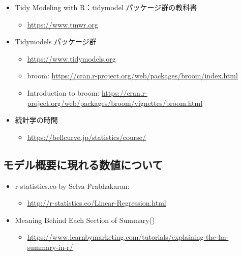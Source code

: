 \documentclass[
  xelatex, ja=standard]{bxjsbook}
\providecommand{\tightlist}{%
  \setlength{\itemsep}{0pt}\setlength{\parskip}{0pt}}
\theoremstyle{definition}
\theoremstyle{definition}
\theoremstyle{definition}
\theoremstyle{definition}
\theoremstyle{remark}
\begin{document}
\begin{itemize}
\tightlist
\item
  Tidy Modeling with R：tidymodel パッケージ群の教科書

  \begin{itemize}
  \tightlist
  \item
    \url{https://www.tmwr.org}
  \end{itemize}
\item
  Tidymodels パッケージ群

  \begin{itemize}
  \tightlist
  \item
    \url{https://www.tidymodels.org}
  \item
    broom: \url{https://cran.r-project.org/web/packages/broom/index.html}
  \item
    Introduction to broom: \url{https://cran.r-project.org/web/packages/broom/vignettes/broom.html}
  \end{itemize}
\item
  統計学の時間

  \begin{itemize}
  \tightlist
  \item
    \url{https://bellcurve.jp/statistics/course/}
  \end{itemize}
\end{itemize}

\hypertarget{ux30e2ux30c7ux30ebux6982ux8981ux306bux73feux308cux308bux6570ux5024ux306bux3064ux3044ux3066}{%
\subsection{モデル概要に現れる数値について}\label{ux30e2ux30c7ux30ebux6982ux8981ux306bux73feux308cux308bux6570ux5024ux306bux3064ux3044ux3066}}

\begin{itemize}
\tightlist
\item
  r-statistics.co by Selva Prabhakaran:

  \begin{itemize}
  \tightlist
  \item
    \url{http://r-statistics.co/Linear-Regression.html}
  \end{itemize}
\item
  Meaning Behind Each Section of Summary()

  \begin{itemize}
  \tightlist
  \item
    \url{https://www.learnbymarketing.com/tutorials/explaining-the-lm-summary-in-r/}
  \end{itemize}
\end{itemize}
\end{document}

